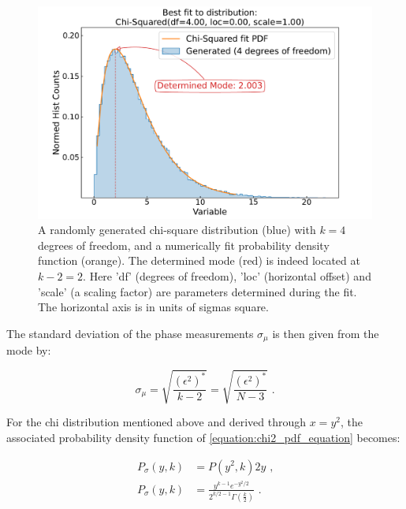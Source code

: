 \begin{figure}[!htb]
    \centering
    \includegraphics*[width=\textwidth]{Figures/Other_Studies/phase_chisquare_demo_fit.pdf}
    \caption{A randomly generated chi-square distribution (\textcolor{mplblue}{blue}) with \(k = 4\) degrees of freedom, and a numerically fit probability density function (\textcolor{mplorange}{orange}). The determined mode (\textcolor{mplred}{red}) is indeed located at \(k - 2 = 2\). Here 'df' (degrees of freedom), 'loc' (horizontal offset) and 'scale' (a scaling factor) are parameters determined during the fit. The horizontal axis is in units of sigmas square.}
    \label{figure:chisquare_demo_fit}
\end{figure}

The standard deviation of the phase measurements \(\sigma_{\mu}\) is then given from the mode by:

\begin{equation}
    \sigma_{\mu} = \sqrt{\frac{(\epsilon^2)^*}{k - 2}} = \sqrt{\frac{(\epsilon^2)^*}{N - 3}} \text{ .}
    \label{equation:stdev_from_chi2_mode}
\end{equation}

For the chi distribution mentioned above and derived through \(x = y^2\), the associated probability density function of \cref{equation:chi2_pdf_equation} becomes:

\begin{equation}
    \begin{aligned}
        P_{\sigma}(y , k) &= P (y^2 , k) 2y \text{ ,} \\
        P_{\sigma}(y , k) &= \frac{y^{k-1} e^{-y^2/2}} {2^{k/2-1} \Gamma(\frac{k}{2})} \text{ .}
    \end{aligned}
    \label{equation:chi_pdf}  
\end{equation}

